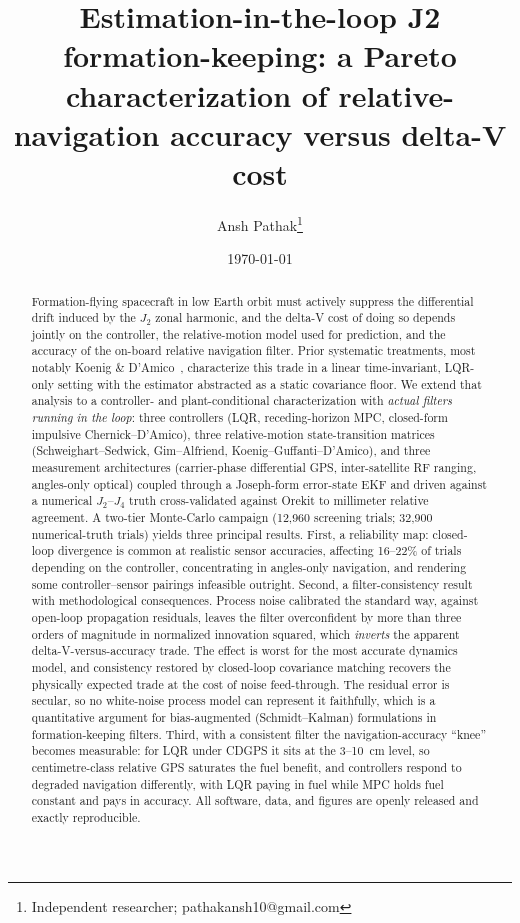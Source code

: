 \documentclass[11pt]{article}
\title{Estimation-in-the-loop J2 formation-keeping: a Pareto
characterization of relative-navigation accuracy versus delta-V cost}
\author{Ansh Pathak\thanks{Independent researcher; pathakansh10@gmail.com}}
\date{\today}
\begin{document}
\maketitle

\begin{abstract}
Formation-flying spacecraft in low Earth orbit must actively suppress the
differential drift induced by the $J_2$ zonal harmonic, and the delta-V cost
of doing so depends jointly on the controller, the relative-motion model
used for prediction, and the accuracy of the on-board relative navigation
filter. Prior systematic treatments, most notably Koenig \&
D'Amico~\cite{koenig2018tradeoffs}, characterize this trade in a linear
time-invariant, LQR-only setting with the estimator abstracted as a static
covariance floor. We extend that analysis to a controller- and
plant-conditional characterization with \emph{actual filters running in the
loop}: three controllers (LQR, receding-horizon MPC, closed-form impulsive
Chernick--D'Amico), three relative-motion state-transition matrices
(Schweighart--Sedwick, Gim--Alfriend, Koenig--Guffanti--D'Amico), and three
measurement architectures (carrier-phase differential GPS, inter-satellite
RF ranging, angles-only optical) coupled through a Joseph-form error-state
EKF and driven against a numerical $J_2$--$J_4$ truth cross-validated
against Orekit to millimeter relative agreement. A two-tier Monte-Carlo
campaign (12{,}960 screening trials; 32{,}900 numerical-truth trials)
yields three principal results. First, a reliability map: closed-loop
divergence is common at realistic sensor accuracies, affecting 16--22\% of
trials depending on the controller, concentrating in angles-only
navigation, and rendering some controller--sensor pairings infeasible
outright. Second, a filter-consistency result with methodological
consequences. Process noise calibrated the standard way, against open-loop
propagation residuals, leaves the filter overconfident by more than three
orders of magnitude in normalized innovation squared, which \emph{inverts}
the apparent delta-V-versus-accuracy trade. The effect is worst for the
most accurate dynamics model, and consistency restored by closed-loop
covariance matching recovers the physically expected trade at the cost of
noise feed-through. The residual error is secular, so no white-noise
process model can represent it faithfully, which is a quantitative argument
for bias-augmented (Schmidt--Kalman) formulations in formation-keeping
filters. Third, with a consistent filter the navigation-accuracy ``knee''
becomes measurable: for LQR under CDGPS it sits at the 3--10~cm level, so
centimetre-class relative GPS saturates the fuel benefit, and controllers
respond to degraded navigation differently, with LQR paying in fuel while
MPC holds fuel constant and pays in accuracy. All software, data, and
figures are openly released and exactly reproducible.
\end{abstract}
\end{document}

